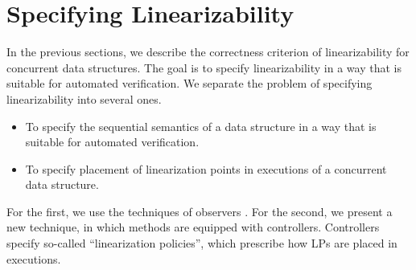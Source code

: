 \chapter{Specifying Linearizability}
In the previous sections, we describe the correctness criterion of linearizability for concurrent data structures. The goal is to specify linearizability in a way that is suitable for automated verification.
We separate the problem of specifying linearizability into several ones.
\begin{itemize}

 \item  To specify the sequential semantics of a data structure in a way that is suitable for automated verification.
  \item To specify placement of linearization points in executions of a concurrent data structure.
  	 
\end{itemize}
  For the first, we use the techniques of observers \cite{AHHR:integrated:rep}. For the second, we present a new technique, in which methods are equipped with controllers. Controllers specify so-called ``linearization policies'', which prescribe how LPs are placed in executions.
 

